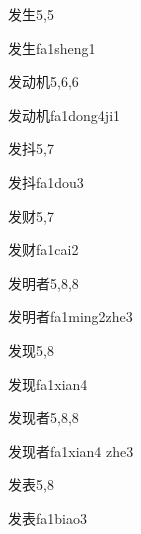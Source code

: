 \begin{entry}{发生}{5,5}
  \begin{phonetics}{发生}{fa1sheng1}
  \end{phonetics}
\end{entry}

\begin{entry}{发动机}{5,6,6}
  \begin{phonetics}{发动机}{fa1dong4ji1}
  \end{phonetics}
\end{entry}

\begin{entry}{发抖}{5,7}
  \begin{phonetics}{发抖}{fa1dou3}
  \end{phonetics}
\end{entry}

\begin{entry}{发财}{5,7}
  \begin{phonetics}{发财}{fa1cai2}
  \end{phonetics}
\end{entry}

\begin{entry}{发明者}{5,8,8}
  \begin{phonetics}{发明者}{fa1ming2zhe3}
  \end{phonetics}
\end{entry}

\begin{entry}{发现}{5,8}
  \begin{phonetics}{发现}{fa1xian4}
  \end{phonetics}
\end{entry}

\begin{entry}{发现者}{5,8,8}
  \begin{phonetics}{发现者}{fa1xian4 zhe3}
  \end{phonetics}
\end{entry}

\begin{entry}{发表}{5,8}
  \begin{phonetics}{发表}{fa1biao3}
  \end{phonetics}
\end{entry}

